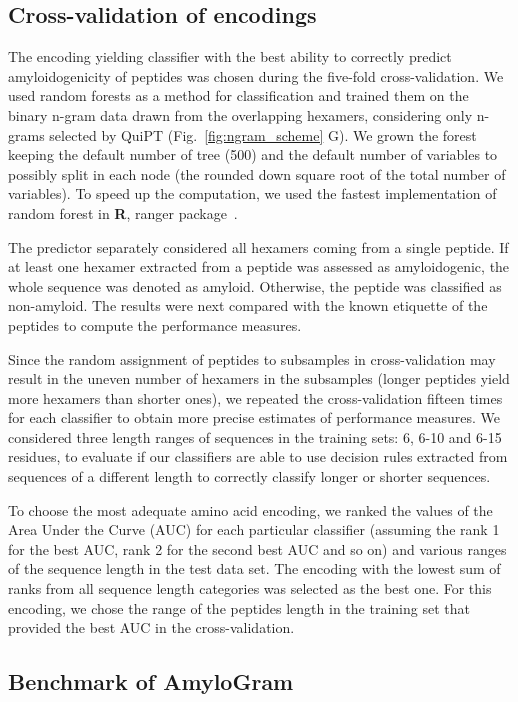 \documentclass[fleqn,10pt,twoside]{gcb15submission}
\begin{document}
\subsection{Cross-validation of encodings}

The encoding yielding classifier with the best ability to correctly predict 
amyloidogenicity of peptides was chosen during the five-fold cross-validation.
We used random forests as a method for classification and trained them on the binary 
n-gram data drawn from the overlapping hexamers, considering only n-grams selected by 
QuiPT (Fig.~\ref{fig:ngram_scheme} G). We grown the forest keeping the default number
of tree (500) and the default number of variables to possibly split in each node 
(the rounded down square root of the total number of variables). To speed up the 
computation, we used the fastest implementation of random forest in \textbf{R}, 
ranger package~\citep{wright_ranger:_2015}.

  The predictor separately considered all hexamers coming from a single peptide. 
If at least one hexamer extracted from a peptide was assessed as amyloidogenic, 
the whole sequence was denoted as amyloid. Otherwise, the peptide was classified 
as non-amyloid. The results were next compared with the known etiquette of the 
peptides to compute the performance measures.

  Since the random assignment 
of peptides to subsamples in cross-validation may result in the uneven number of hexamers in 
the subsamples (longer peptides yield more hexamers than shorter ones), we 
repeated the cross-validation fifteen times for each classifier to obtain more 
precise estimates of performance measures. We considered three length ranges 
of sequences in the training sets: 6, 6-10 and 6-15 residues, to evaluate if our classifiers 
are able to use decision rules extracted from sequences of a different length to correctly 
classify longer or shorter sequences. 

  To choose the most adequate amino acid encoding, we ranked the values of the Area 
Under the Curve (AUC) for each particular classifier (assuming the rank 1 for the best AUC, 
rank 2 for the second best AUC and so on) and various ranges of the sequence length 
in the test data set. The encoding with the lowest sum of ranks from all 
sequence length categories was selected as the best one. For this encoding, we 
chose the range of the peptides length in the training set that provided the best 
AUC in the cross-validation. 

\subsection{Benchmark of AmyloGram}
\end{document}
